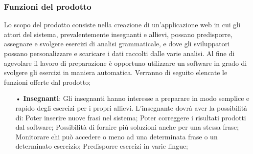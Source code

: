 \subsubsection{Funzioni del prodotto}
Lo scopo del prodotto consiste nella creazione di un'applicazione web in cui gli attori del sistema, prevalentemente insegnanti e allievi, possano predisporre, assegnare e svolgere esercizi di analisi grammaticale, e dove gli sviluppatori possano personalizzare e scaricare i dati raccolti dalle varie analisi.
Al fine di agevolare il lavoro di preparazione è opportuno utilizzare un software in grado di svolgere gli esercizi in maniera automatica.
Verranno di seguito elencate le funzioni offerte dal prodotto;
\begin{itemize}
\item[•]\textbf{Insegnanti}:
Gli insegnanti hanno interesse a preparare in modo semplice e rapido degli esercizi per i propri allievi.
L'insegnante dovrà aver la possibilità di:
Poter inserire nuove frasi nel sistema;
Poter correggere i risultati prodotti dal software;
Possibilità di fornire più soluzioni anche per una stessa frase;
Monitorare chi può accedere o meno ad una determinata frase o un determinato esercizio;
Predisporre esercizi in varie lingue;


\end{itemize}
